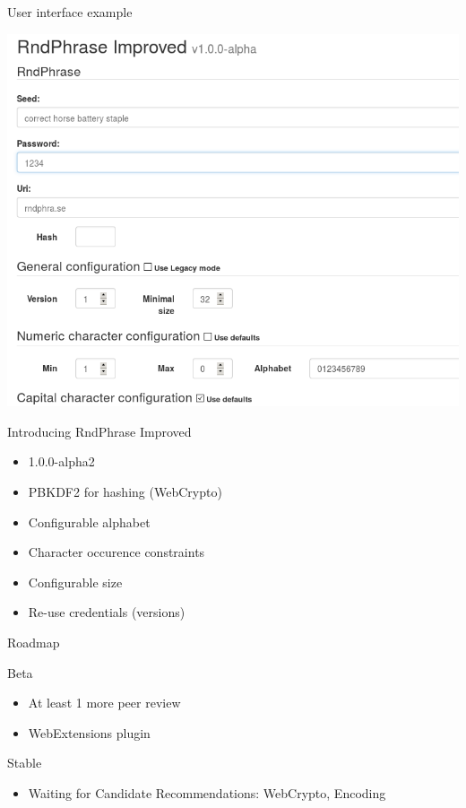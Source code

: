 \documentclass{beamer}
\begin{document}
\begin{frame}{User interface example}
  \begin{center}
    \includegraphics[scale=0.35]{rndphrase-screenshot.png}
  \end{center}
\end{frame}

\begin{frame}{Introducing RndPhrase Improved}
  \begin{itemize}
    \item 1.0.0-alpha2
    \item PBKDF2 for hashing (WebCrypto)
    \item Configurable alphabet
    \item Character occurence constraints
    \item Configurable size
    \item Re-use credentials (versions)
  \end{itemize}
\end{frame}

\begin{frame}{Roadmap}
  \begin{block}{Beta}
    \begin{itemize}
      \item At least 1 more peer review
      \item WebExtensions plugin
    \end{itemize}
  \end{block}
  \begin{block}{Stable}
    \begin{itemize}
      \item Waiting for Candidate Recommendations: WebCrypto, Encoding
    \end{itemize}
  \end{block}
\end{frame}
\end{document}
